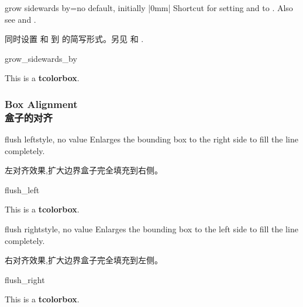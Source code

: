 \begin{docTcbKey}[][doc new=2018-03-22]{grow sidewards by}{=}{no default, initially |0mm|}
Shortcut for setting  and 
to . Also see  and .

同时设置  和  到 的简写形式。另见  和 .
\begin{exdispExample}[safety=2cm]{grow_sidewards_by}

\begin{tcolorbox}[grow sidewards by=2cm,enhanced,show bounding box]
This is a \textbf{tcolorbox}.
\end{tcolorbox}
\end{exdispExample}
\end{docTcbKey}




\subsubsection{Box Alignment\\盒子的对齐}

\begin{docTcbKey}[][doc new=2015-11-20]{flush left}{}{style, no value}
Enlarges the bounding box to the right side to fill the line completely.

左对齐效果,扩大边界盒子完全填充到右侧。
\begin{exdispExample}{flush_left}

\begin{tcolorbox}[flush left,width=5cm,enhanced,show bounding box]
This is a \textbf{tcolorbox}.
\end{tcolorbox}
\end{exdispExample}
\end{docTcbKey}


\begin{docTcbKey}[][doc new=2015-11-20]{flush right}{}{style, no value}
Enlarges the bounding box to the left side to fill the line completely.

右对齐效果,扩大边界盒子完全填充到左侧。
\begin{exdispExample}{flush_right}

\begin{tcolorbox}[flush right,width=5cm,enhanced,show bounding box]
This is a \textbf{tcolorbox}.
\end{tcolorbox}
\end{exdispExample}
\end{docTcbKey}



